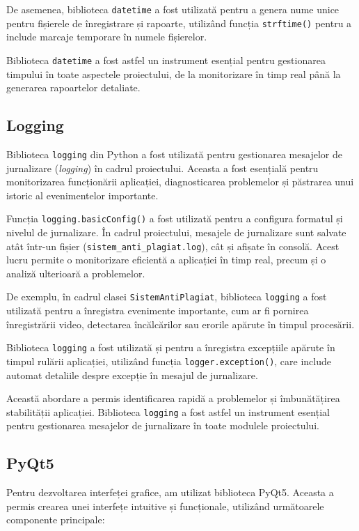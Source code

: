 \documentclass[12pt,a4paper]{article}
\begin{document}
De asemenea, biblioteca \texttt{datetime} a fost utilizată pentru a genera nume unice pentru fișierele de înregistrare și rapoarte, utilizând funcția \texttt{strftime()} pentru a include marcaje temporare în numele fișierelor.

Biblioteca \texttt{datetime} a fost astfel un instrument esențial pentru gestionarea timpului în toate aspectele proiectului, de la monitorizare în timp real până la generarea rapoartelor detaliate.

\subsection{Logging}
Biblioteca \texttt{logging}\cite{pythonlogging} din Python a fost utilizată pentru gestionarea mesajelor de jurnalizare (\textit{logging}) în cadrul proiectului. Aceasta a fost esențială pentru monitorizarea funcționării aplicației, diagnosticarea problemelor și păstrarea unui istoric al evenimentelor importante.

Funcția \texttt{logging.basicConfig()} a fost utilizată pentru a configura formatul și nivelul de jurnalizare. În cadrul proiectului, mesajele de jurnalizare sunt salvate atât într-un fișier (\texttt{sistem\_anti\_plagiat.log}), cât și afișate în consolă. Acest lucru permite o monitorizare eficientă a aplicației în timp real, precum și o analiză ulterioară a problemelor.

De exemplu, în cadrul clasei \texttt{SistemAntiPlagiat}, biblioteca \texttt{logging} a fost utilizată pentru a înregistra evenimente importante, cum ar fi pornirea înregistrării video, detectarea încălcărilor sau erorile apărute în timpul procesării.

Biblioteca \texttt{logging} a fost utilizată și pentru a înregistra excepțiile apărute în timpul rulării aplicației, utilizând funcția \texttt{logger.exception()}, care include automat detaliile despre excepție în mesajul de jurnalizare.

Această abordare a permis identificarea rapidă a problemelor și îmbunătățirea stabilității aplicației. Biblioteca \texttt{logging} a fost astfel un instrument esențial pentru gestionarea mesajelor de jurnalizare în toate modulele proiectului.

\subsection{PyQt5}
Pentru dezvoltarea interfeței grafice, am utilizat biblioteca PyQt5\cite{pyqt5}. Aceasta a permis crearea unei interfețe intuitive și funcționale, utilizând următoarele componente principale:
\end{document}
